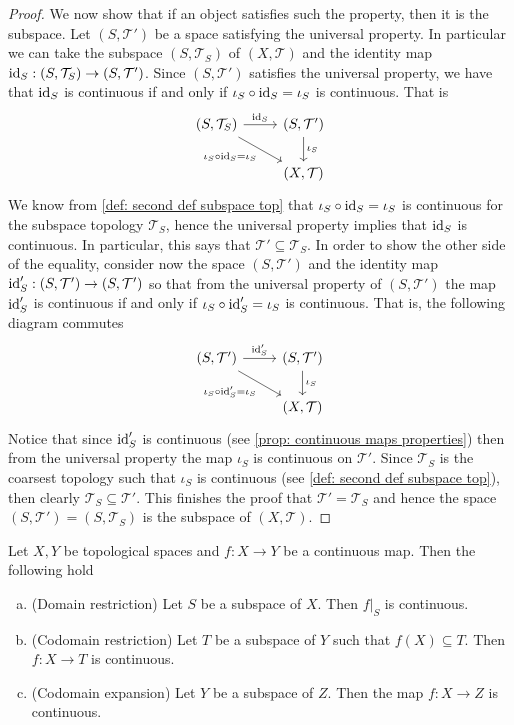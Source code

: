 \begin{proof}
  We now show that if an object satisfies such the property, then it is the
  subspace. Let \((S, \mathcal T')\) be a space satisfying the universal
  property. In particular we can take the subspace \((S, \mathcal T_S)\) of
  \((X, \mathcal T)\) and the identity map \(\operatorname{id}_S: (S, \mathcal T_S) \to (S,
  \mathcal T')\). Since \((S, \mathcal T')\) satisfies the universal property,
  we have that \(\operatorname{id}_S\) is continuous if and only if \(\iota_S \circ \operatorname{id}_S =
  \iota_S\) is continuous. That is
  \[
    \begin{tikzcd}
      (S, \mathcal T_S)
      \ar[r, "\Id_S"]
      \ar[rd, swap, "\iota_S \circ \Id_S = \iota_S"]
        &(S, \mathcal T') \ar[d, "\iota_S"] \\
        &(X, \mathcal T)
    \end{tikzcd}
  \]
  We know from \cref{def: second def subspace top} that \(\iota_S \circ \operatorname{id}_S =
  \iota_S\) is continuous for the subspace topology \(\mathcal T_S\), hence the
  universal property implies that \(\operatorname{id}_S\) is continuous. In particular, this
  says that \(\mathcal T' \subseteq \mathcal T_S\). In order to show the other
  side of the equality, consider now the space \((S, \mathcal T')\) and the
  identity map \(\operatorname{id}_S': (S, \mathcal T') \to (S, \mathcal T')\) so that from the
  universal property of \((S, \mathcal T')\) the map \(\operatorname{id}_S'\) is continuous if
  and only if \(\iota_S \circ \operatorname{id}_S' = \iota_S\) is continuous. That is, the
  following diagram commutes
  \[
    \begin{tikzcd}
      (S, \mathcal T') \ar[r, "\Id_S'"]
      \ar[rd, swap, "\iota_S \circ \Id_S' = \iota_S"]
        &(S, \mathcal T') \ar[d, "\iota_S"] \\
        &(X, \mathcal T)
    \end{tikzcd}
  \]
  Notice that since \(\operatorname{id}_S'\) is continuous (see \cref{prop: continuous maps
  properties}) then from the universal property the map \(\iota_S\) is
  continuous on \(\mathcal T'\). Since \(\mathcal T_S\) is the coarsest topology
  such that \(\iota_S\) is continuous (see \cref{def: second def subspace top}),
  then clearly \(\mathcal T_S \subseteq \mathcal T'\). This finishes the proof
  that \(\mathcal T' = \mathcal T_S\) and hence the space \((S, \mathcal T') =
  (S, \mathcal T_S)\) is the subspace of \((X, \mathcal T)\).
\end{proof}

\begin{corollary}\label{cor: subspace maps properties}
  Let \(X, Y\) be topological spaces and \(f: X \to Y\) be a continuous map.
  Then the following hold
  \begin{enumerate}[(a)]
    \item (Domain restriction) Let \(S\) be a subspace of \(X\). Then \(f|_S\)
      is continuous.
    \item (Codomain restriction) Let \(T\) be a subspace of \(Y\) such that
      \(f(X) \subseteq T\). Then \(f: X \to T\) is continuous.
    \item (Codomain expansion) Let \(Y\) be a subspace of \(Z\). Then the map
      \(f : X \to Z\) is continuous.
  \end{enumerate}
\end{corollary}

